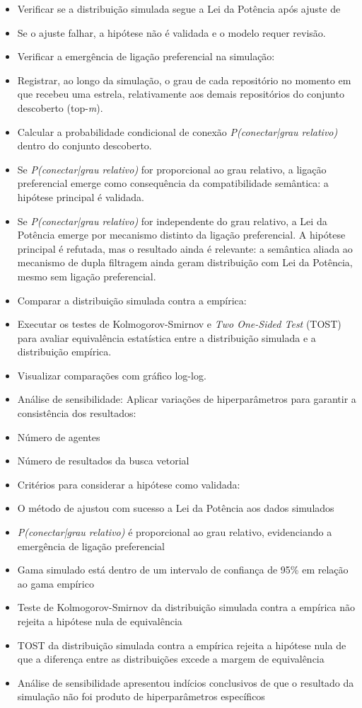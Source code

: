 \documentclass[12pt,oneside,a4paper,brazil,sumario=tradicional]{abntex2}
\begin{document}
\begin{itemize}
  \item Verificar se a distribuição simulada segue a Lei da Potência após ajuste de \textcite{clauset2009}
  \item Se o ajuste falhar, a hipótese não é validada e o modelo requer revisão.
  \item Verificar a emergência de ligação preferencial na simulação:
  \item Registrar, ao longo da simulação, o grau de cada repositório no momento em que recebeu uma estrela, relativamente aos demais repositórios do conjunto descoberto (top-\textit{m}).
  \item Calcular a probabilidade condicional de conexão \textit{P(conectar|grau relativo)} dentro do conjunto descoberto.
  \item Se \textit{P(conectar|grau relativo)} for proporcional ao grau relativo, a ligação preferencial emerge como consequência da compatibilidade semântica: a hipótese principal é validada.
  \item Se \textit{P(conectar|grau relativo)} for independente do grau relativo, a Lei da Potência emerge por mecanismo distinto da ligação preferencial. A hipótese principal é refutada, mas o resultado ainda é relevante: a semântica aliada ao mecanismo de dupla filtragem ainda geram distribuição com Lei da Potência, mesmo sem ligação preferencial.
  \item Comparar a distribuição simulada contra a empírica:
  \item Executar os testes de Kolmogorov-Smirnov e \textit{Two One-Sided Test }(TOST) para avaliar equivalência estatística entre a distribuição simulada e a distribuição empírica.
  \item Visualizar comparações com gráfico log-log.
  \item Análise de sensibilidade: Aplicar variações de hiperparâmetros para garantir a consistência dos resultados:
  \item Número de agentes
  \item Número de resultados da busca vetorial
  \item Critérios para considerar a hipótese como validada:
  \item O método de \textcite{clauset2009} ajustou com sucesso a Lei da Potência aos dados simulados
  \item \textit{P(conectar|grau relativo)} é proporcional ao grau relativo, evidenciando a emergência de ligação preferencial
  \item Gama simulado está dentro de um intervalo de confiança de 95\% em relação ao gama empírico
  \item Teste de Kolmogorov-Smirnov da distribuição simulada contra a empírica não rejeita a hipótese nula de equivalência
  \item TOST da distribuição simulada contra a empírica rejeita a hipótese nula de que a diferença entre as distribuições excede a margem de equivalência
  \item Análise de sensibilidade apresentou indícios conclusivos de que o resultado da simulação não foi produto de hiperparâmetros específicos
\end{itemize}
\postextual
\printbibliography[heading=bibintoc,title={Referências Bibliográficas}]
\end{document}
